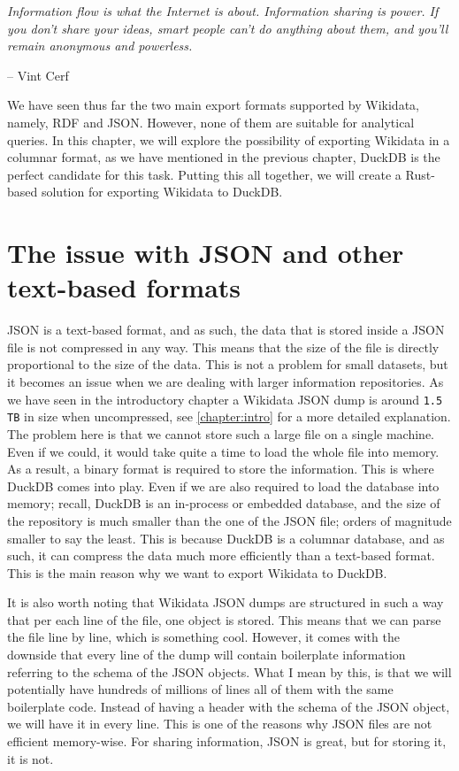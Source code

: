 \epigraph{\textit{Information flow is what the Internet is about. Information sharing is power. If you don't share your ideas, smart people can't do anything about them, and you'll remain anonymous and powerless.}}{-- \textup{Vint Cerf}}

We have seen thus far the two main export formats supported by Wikidata, namely, RDF and JSON. However, none of them are suitable for analytical queries. In this chapter, we will explore the possibility of exporting Wikidata in a columnar format, as we have mentioned in the previous chapter, DuckDB is the perfect candidate for this task. Putting this all together, we will create a Rust-based solution for exporting Wikidata to DuckDB.

\section{The issue with JSON and other text-based formats}

JSON is a text-based format, and as such, the data that is stored inside a JSON file is not compressed in any way. This means that the size of the file is directly proportional to the size of the data. This is not a problem for small datasets, but it becomes an issue when we are dealing with larger information repositories. As we have seen in the introductory chapter a Wikidata JSON dump is around \texttt{1.5 TB} in size when uncompressed, see \ref{chapter:intro} for a more detailed explanation. The problem here is that we cannot store such a large file on a single machine. Even if we could, it would take quite a time to load the whole file into memory. As a result, a binary format is required to store the information. This is where DuckDB comes into play. Even if we are also required to load the database into memory; recall, DuckDB is an in-process or embedded database, and the size of the repository is much smaller than the one of the JSON file; orders of magnitude smaller to say the least. This is because DuckDB is a columnar database, and as such, it can compress the data much more efficiently than a text-based format. This is the main reason why we want to export Wikidata to DuckDB.

It is also worth noting that Wikidata JSON dumps are structured in such a way that per each line of the file, one object is stored. This means that we can parse the file line by line, which is something cool. However, it comes with the downside that every line of the dump will contain boilerplate information referring to the schema of the JSON objects. What I mean by this, is that we will potentially have hundreds of millions of lines all of them with the same boilerplate code. Instead of having a header with the schema of the JSON object, we will have it in every line. This is one of the reasons why JSON files are not efficient memory-wise. For sharing information, JSON is great, but for storing it, it is not.

